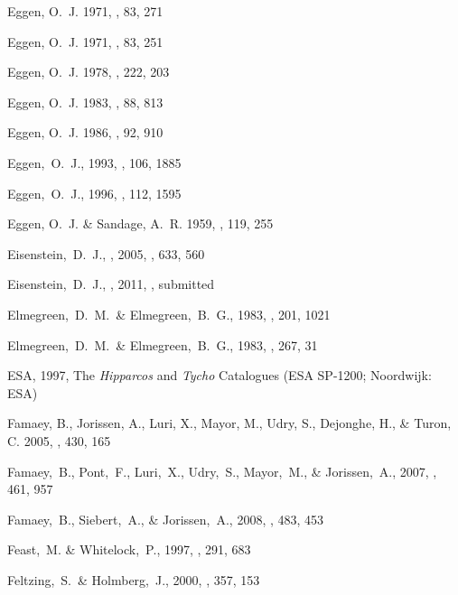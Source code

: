 \begin{thebibliography}{99}
{Eggen}, O.~J. 1971{}, \pasp, 83, 271

{Eggen}, O.~J. 1971{}, \pasp, 83, 251

{Eggen}, O.~J. 1978, \apj, 222, 203

{Eggen}, O.~J. 1983, \aj, 88, 813

{Eggen}, O.~J. 1986, \aj, 92, 910

  Eggen,~O.~J., 1993,
  \aj, 106, 1885

  Eggen,~O.~J., 1996,
  \aj, 112, 1595

{Eggen}, O.~J. \& {Sandage}, A.~R. 1959, \mnras, 119, 255

  Eisenstein,~D.~J., \etal, 2005, \apj, 633, 560

  Eisenstein,~D.~J., \etal, 2011, \aj, submitted

  Elmegreen,~D.~M.~\& Elmegreen,~B.~G., 1983,
  \mnras, 201, 1021

  Elmegreen,~D.~M.~\& Elmegreen,~B.~G., 1983,
  \apj, 267, 31

{ESA}, 1997, {The \emph{Hipparcos} and \emph{Tycho} Catalogues} (ESA SP-1200; Noordwijk: ESA)

  {Famaey}, B., {Jorissen}, A., {Luri}, X., {Mayor}, M., {Udry}, S., {Dejonghe},
  H., \& {Turon}, C. 2005, \aap, 430, 165

  Famaey,~B., Pont,~F., Luri,~X., Udry,~S., Mayor,~M., \& Jorissen,~A., 2007,
  \aap, 461, 957

  Famaey,~B., Siebert,~A., \& Jorissen,~A., 2008,
  \aap, 483, 453

 Feast,~M. \& Whitelock,~P., 1997,
  \mnras, 291, 683

  Feltzing,~S.~\& Holmberg,~J., 2000,
  \aap, 357, 153
  

\end{thebibliography}
